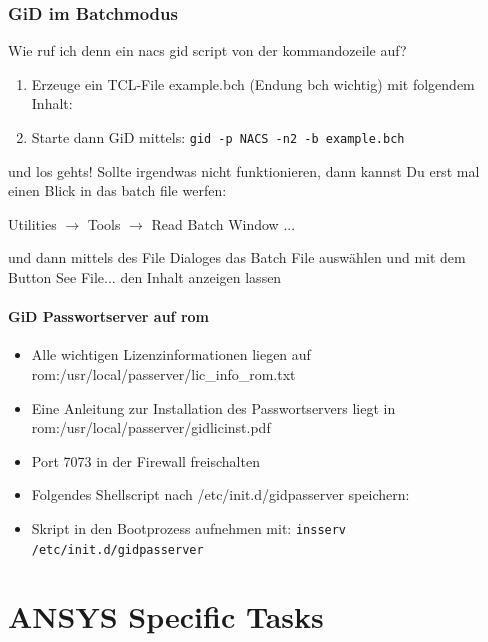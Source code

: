 

\subsubsection{GiD im Batchmodus}

\noindent Wie ruf ich denn ein nacs gid script von der kommandozeile auf?

\begin{enumerate}
   \item{Erzeuge ein TCL-File example.bch (Endung bch wichtig) mit folgendem Inhalt: }
   \item{Starte dann GiD mittels: {\tt gid -p NACS -n2 -b example.bch}}
\end{enumerate}

\noindent und los gehts! Sollte  irgendwas nicht funktionieren, dann kannst Du
erst mal einen Blick in das batch file werfen:

\noindent Utilities $\rightarrow$ Tools $\rightarrow$ Read Batch Window ...

\noindent und dann mittels des File  Dialoges das Batch File auswählen und mit
dem Button See File... den Inhalt anzeigen lassen

\paragraph{GiD Passwortserver auf rom}
\begin{itemize}
\item{Alle wichtigen Lizenzinformationen liegen auf rom:/usr/local/passerver/lic\_info\_rom.txt}
\item{Eine Anleitung zur Installation des Passwortservers liegt in rom:/usr/local/passerver/gidlicinst.pdf }
\item{Port 7073 in der Firewall freischalten}
\item{Folgendes Shellscript nach /etc/init.d/gidpasserver speichern:
  
}
\item{Skript in den Bootprozess aufnehmen mit: {\tt insserv /etc/init.d/gidpasserver} }
\end{itemize}

\section{ANSYS Specific Tasks}


